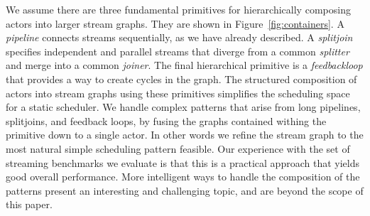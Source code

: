 We assume there are three fundamental primitives for hierarchically
composing actors into larger stream graphs. They are shown in
Figure~\ref{fig:containers}. A {\it pipeline} connects streams
sequentially, as we have already described. A {\it splitjoin}
specifies independent and parallel streams that diverge from a common
{\it splitter} and merge into a common {\it joiner}. The final
hierarchical primitive is a {\it feedbackloop} that provides a way to
create cycles in the graph. The structured composition of actors into
stream graphs using these primitives simplifies the scheduling space
for a static scheduler. We handle complex patterns that arise from
long pipelines, splitjoins, and feedback loops, by fusing the graphs
contained withing the primitive down to a single actor. In other words
we refine the stream graph to the most natural simple scheduling
pattern feasible. Our experience with the set of streaming benchmarks
we evaluate is that this is a practical approach that yields good
overall performance. More intelligent ways to handle the composition
of the patterns present an interesting and challenging topic, and are
beyond the scope of this paper.


